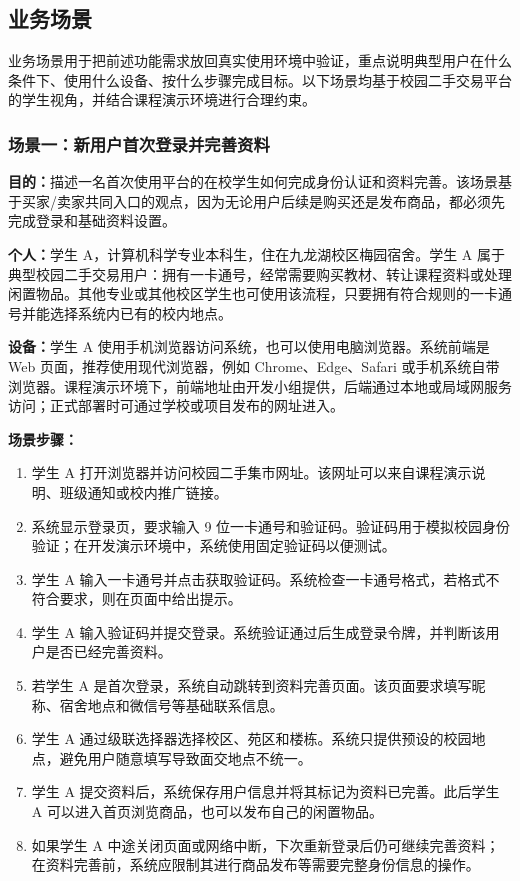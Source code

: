 ﻿\documentclass[UTF8,a4paper,12pt]{ctexart}
\begin{document}
\subsection{业务场景}
业务场景用于把前述功能需求放回真实使用环境中验证，重点说明典型用户在什么条件下、使用什么设备、按什么步骤完成目标。以下场景均基于校园二手交易平台的学生视角，并结合课程演示环境进行合理约束。

\subsubsection{场景一：新用户首次登录并完善资料}
\textbf{目的：}描述一名首次使用平台的在校学生如何完成身份认证和资料完善。该场景基于买家/卖家共同入口的观点，因为无论用户后续是购买还是发布商品，都必须先完成登录和基础资料设置。

\textbf{个人：}学生 A，计算机科学专业本科生，住在九龙湖校区梅园宿舍。学生 A 属于典型校园二手交易用户：拥有一卡通号，经常需要购买教材、转让课程资料或处理闲置物品。其他专业或其他校区学生也可使用该流程，只要拥有符合规则的一卡通号并能选择系统内已有的校内地点。

\textbf{设备：}学生 A 使用手机浏览器访问系统，也可以使用电脑浏览器。系统前端是 Web 页面，推荐使用现代浏览器，例如 Chrome、Edge、Safari 或手机系统自带浏览器。课程演示环境下，前端地址由开发小组提供，后端通过本地或局域网服务访问；正式部署时可通过学校或项目发布的网址进入。

\textbf{场景步骤：}
\begin{enumerate}
  \item 学生 A 打开浏览器并访问校园二手集市网址。该网址可以来自课程演示说明、班级通知或校内推广链接。
  \item 系统显示登录页，要求输入 9 位一卡通号和验证码。验证码用于模拟校园身份验证；在开发演示环境中，系统使用固定验证码以便测试。
  \item 学生 A 输入一卡通号并点击获取验证码。系统检查一卡通号格式，若格式不符合要求，则在页面中给出提示。
  \item 学生 A 输入验证码并提交登录。系统验证通过后生成登录令牌，并判断该用户是否已经完善资料。
  \item 若学生 A 是首次登录，系统自动跳转到资料完善页面。该页面要求填写昵称、宿舍地点和微信号等基础联系信息。
  \item 学生 A 通过级联选择器选择校区、苑区和楼栋。系统只提供预设的校园地点，避免用户随意填写导致面交地点不统一。
  \item 学生 A 提交资料后，系统保存用户信息并将其标记为资料已完善。此后学生 A 可以进入首页浏览商品，也可以发布自己的闲置物品。
  \item 如果学生 A 中途关闭页面或网络中断，下次重新登录后仍可继续完善资料；在资料完善前，系统应限制其进行商品发布等需要完整身份信息的操作。
\end{enumerate}
\end{document}
